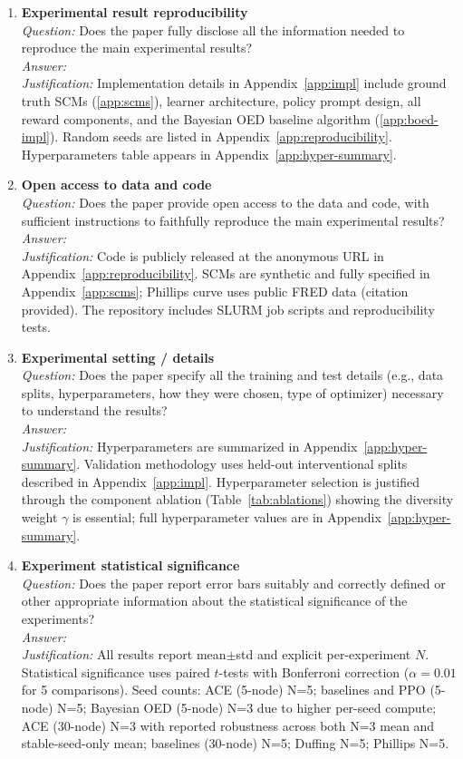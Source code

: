 \begin{enumerate}
\item \textbf{Experimental result reproducibility}\\
\emph{Question:} Does the paper fully disclose all the information needed to reproduce the main experimental results?\\
\emph{Answer:} \answerYes{}\\
\emph{Justification:} Implementation details in Appendix~\ref{app:impl} include ground truth SCMs (\ref{app:scms}), learner architecture, policy prompt design, all reward components, and the Bayesian OED baseline algorithm (\ref{app:boed-impl}). Random seeds are listed in Appendix~\ref{app:reproducibility}. Hyperparameters table appears in Appendix~\ref{app:hyper-summary}.

\item \textbf{Open access to data and code}\\
\emph{Question:} Does the paper provide open access to the data and code, with sufficient instructions to faithfully reproduce the main experimental results?\\
\emph{Answer:} \answerYes{}\\
\emph{Justification:} Code is publicly released at the anonymous URL in Appendix~\ref{app:reproducibility}. SCMs are synthetic and fully specified in Appendix~\ref{app:scms}; Phillips curve uses public FRED data (citation provided). The repository includes SLURM job scripts and reproducibility tests.

\item \textbf{Experimental setting / details}\\
\emph{Question:} Does the paper specify all the training and test details (e.g., data splits, hyperparameters, how they were chosen, type of optimizer) necessary to understand the results?\\
\emph{Answer:} \answerYes{}\\
\emph{Justification:} Hyperparameters are summarized in Appendix~\ref{app:hyper-summary}. Validation methodology uses held-out interventional splits described in Appendix~\ref{app:impl}. Hyperparameter selection is justified through the component ablation (Table~\ref{tab:ablations}) showing the diversity weight $\gamma$ is essential; full hyperparameter values are in Appendix~\ref{app:hyper-summary}.

\item \textbf{Experiment statistical significance}\\
\emph{Question:} Does the paper report error bars suitably and correctly defined or other appropriate information about the statistical significance of the experiments?\\
\emph{Answer:} \answerYes{}\\
\emph{Justification:} All results report mean$\pm$std and explicit per-experiment $N$. Statistical significance uses paired $t$-tests with Bonferroni correction ($\alpha = 0.01$ for 5 comparisons). Seed counts: ACE (5-node) N=5; baselines and PPO (5-node) N=5; Bayesian OED (5-node) N=3 due to higher per-seed compute; ACE (30-node) N=3 with reported robustness across both N=3 mean and stable-seed-only mean; baselines (30-node) N=5; Duffing N=5; Phillips N=5.


\end{enumerate}

